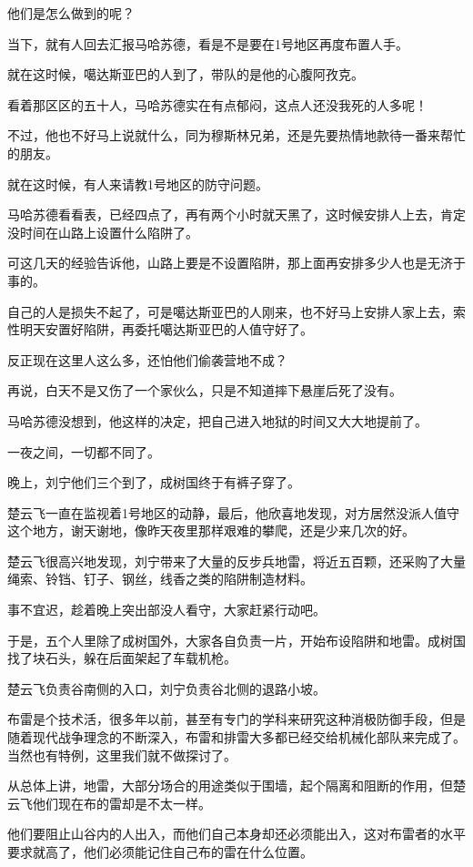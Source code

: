 他们是怎么做到的呢？

当下，就有人回去汇报马哈苏德，看是不是要在1号地区再度布置人手。

就在这时候，噶达斯亚巴的人到了，带队的是他的心腹阿孜克。

看着那区区的五十人，马哈苏德实在有点郁闷，这点人还没我死的人多呢！

不过，他也不好马上说就什么，同为穆斯林兄弟，还是先要热情地款待一番来帮忙的朋友。

就在这时候，有人来请教1号地区的防守问题。

马哈苏德看看表，已经四点了，再有两个小时就天黑了，这时候安排人上去，肯定没时间在山路上设置什么陷阱了。

可这几天的经验告诉他，山路上要是不设置陷阱，那上面再安排多少人也是无济于事的。

自己的人是损失不起了，可是噶达斯亚巴的人刚来，也不好马上安排人家上去，索性明天安置好陷阱，再委托噶达斯亚巴的人值守好了。

反正现在这里人这么多，还怕他们偷袭营地不成？

再说，白天不是又伤了一个家伙么，只是不知道摔下悬崖后死了没有。

马哈苏德没想到，他这样的决定，把自己进入地狱的时间又大大地提前了。

一夜之间，一切都不同了。

晚上，刘宁他们三个到了，成树国终于有裤子穿了。

楚云飞一直在监视着1号地区的动静，最后，他欣喜地发现，对方居然没派人值守这个地方，谢天谢地，像昨天夜里那样艰难的攀爬，还是少来几次的好。

楚云飞很高兴地发现，刘宁带来了大量的反步兵地雷，将近五百颗，还采购了大量绳索、铃铛、钉子、钢丝，线香之类的陷阱制造材料。

事不宜迟，趁着晚上突出部没人看守，大家赶紧行动吧。

于是，五个人里除了成树国外，大家各自负责一片，开始布设陷阱和地雷。成树国找了块石头，躲在后面架起了车载机枪。

楚云飞负责谷南侧的入口，刘宁负责谷北侧的退路小坡。

布雷是个技术活，很多年以前，甚至有专门的学科来研究这种消极防御手段，但是随着现代战争理念的不断深入，布雷和排雷大多都已经交给机械化部队来完成了。当然也有特例，这里我们就不做探讨了。

从总体上讲，地雷，大部分场合的用途类似于围墙，起个隔离和阻断的作用，但楚云飞他们现在布的雷却是不太一样。

他们要阻止山谷内的人出入，而他们自己本身却还必须能出入，这对布雷者的水平要求就高了，他们必须能记住自己布的雷在什么位置。

